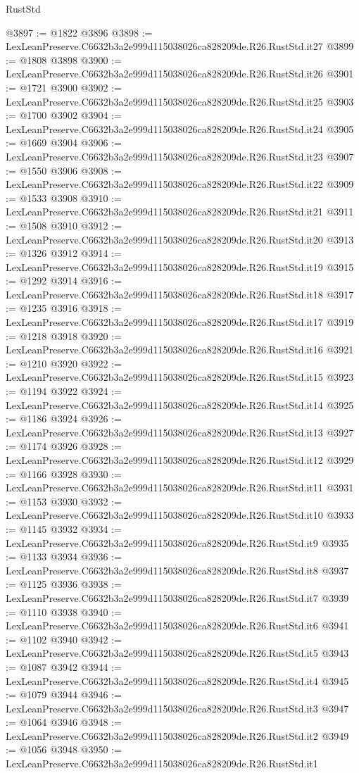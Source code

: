 \begin{lexlean}{RustStd}
\begin{coremodule}
@3897 := @1822 @3896
@3898 := LexLeanPreserve.C6632b3a2e999d115038026ca828209de.R26.RustStd.it27
@3899 := @1808 @3898
@3900 := LexLeanPreserve.C6632b3a2e999d115038026ca828209de.R26.RustStd.it26
@3901 := @1721 @3900
@3902 := LexLeanPreserve.C6632b3a2e999d115038026ca828209de.R26.RustStd.it25
@3903 := @1700 @3902
@3904 := LexLeanPreserve.C6632b3a2e999d115038026ca828209de.R26.RustStd.it24
@3905 := @1669 @3904
@3906 := LexLeanPreserve.C6632b3a2e999d115038026ca828209de.R26.RustStd.it23
@3907 := @1550 @3906
@3908 := LexLeanPreserve.C6632b3a2e999d115038026ca828209de.R26.RustStd.it22
@3909 := @1533 @3908
@3910 := LexLeanPreserve.C6632b3a2e999d115038026ca828209de.R26.RustStd.it21
@3911 := @1508 @3910
@3912 := LexLeanPreserve.C6632b3a2e999d115038026ca828209de.R26.RustStd.it20
@3913 := @1326 @3912
@3914 := LexLeanPreserve.C6632b3a2e999d115038026ca828209de.R26.RustStd.it19
@3915 := @1292 @3914
@3916 := LexLeanPreserve.C6632b3a2e999d115038026ca828209de.R26.RustStd.it18
@3917 := @1235 @3916
@3918 := LexLeanPreserve.C6632b3a2e999d115038026ca828209de.R26.RustStd.it17
@3919 := @1218 @3918
@3920 := LexLeanPreserve.C6632b3a2e999d115038026ca828209de.R26.RustStd.it16
@3921 := @1210 @3920
@3922 := LexLeanPreserve.C6632b3a2e999d115038026ca828209de.R26.RustStd.it15
@3923 := @1194 @3922
@3924 := LexLeanPreserve.C6632b3a2e999d115038026ca828209de.R26.RustStd.it14
@3925 := @1186 @3924
@3926 := LexLeanPreserve.C6632b3a2e999d115038026ca828209de.R26.RustStd.it13
@3927 := @1174 @3926
@3928 := LexLeanPreserve.C6632b3a2e999d115038026ca828209de.R26.RustStd.it12
@3929 := @1166 @3928
@3930 := LexLeanPreserve.C6632b3a2e999d115038026ca828209de.R26.RustStd.it11
@3931 := @1153 @3930
@3932 := LexLeanPreserve.C6632b3a2e999d115038026ca828209de.R26.RustStd.it10
@3933 := @1145 @3932
@3934 := LexLeanPreserve.C6632b3a2e999d115038026ca828209de.R26.RustStd.it9
@3935 := @1133 @3934
@3936 := LexLeanPreserve.C6632b3a2e999d115038026ca828209de.R26.RustStd.it8
@3937 := @1125 @3936
@3938 := LexLeanPreserve.C6632b3a2e999d115038026ca828209de.R26.RustStd.it7
@3939 := @1110 @3938
@3940 := LexLeanPreserve.C6632b3a2e999d115038026ca828209de.R26.RustStd.it6
@3941 := @1102 @3940
@3942 := LexLeanPreserve.C6632b3a2e999d115038026ca828209de.R26.RustStd.it5
@3943 := @1087 @3942
@3944 := LexLeanPreserve.C6632b3a2e999d115038026ca828209de.R26.RustStd.it4
@3945 := @1079 @3944
@3946 := LexLeanPreserve.C6632b3a2e999d115038026ca828209de.R26.RustStd.it3
@3947 := @1064 @3946
@3948 := LexLeanPreserve.C6632b3a2e999d115038026ca828209de.R26.RustStd.it2
@3949 := @1056 @3948
@3950 := LexLeanPreserve.C6632b3a2e999d115038026ca828209de.R26.RustStd.it1

\end{coremodule}
\end{lexlean}
